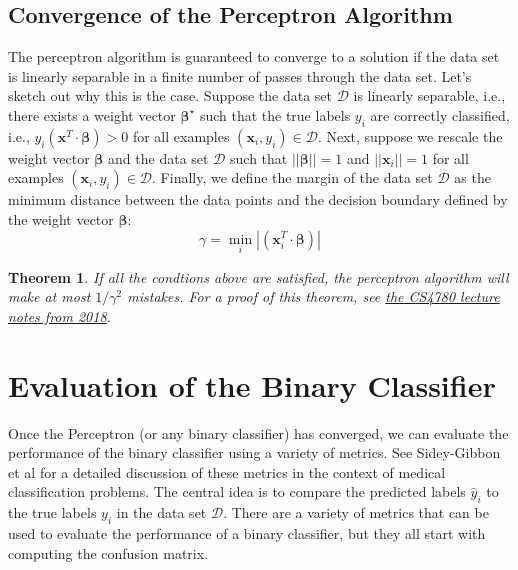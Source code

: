 \documentclass{article}[12pt]
\newtheorem{theorem}{Theorem}
\newcommand{\norm}[1]{\left|\left|#1\right|\right|}
\begin{document}
\subsection{Convergence of the Perceptron Algorithm}
The perceptron algorithm is guaranteed to converge to a solution if the data set is linearly separable in a finite number of passes through the data set.
Let's sketch out why this is the case.
Suppose the data set $\mathcal{D}$ is linearly separable, i.e., there exists a weight vector $\mathbf{\beta}^{\star}$ such that the true labels $y_{i}$ are correctly classified, i.e., 
$y_{i}\left(\mathbf{x}^{T}\cdot\mathbf{\beta}\right)>0$ for all examples $(\mathbf{x}_{i},y_{i})\in\mathcal{D}$.
Next, suppose we rescale the weight vector $\mathbf{\beta}$ and the data set $\mathcal{D}$ such that $\norm{\mathbf{\beta}}=1$ and $\norm{\mathbf{x}_{i}}=1$ for all examples $(\mathbf{x}_{i},y_{i})\in\mathcal{D}$.
Finally, we define the margin of the data set $\mathcal{D}$ as the minimum distance between the data points and the decision boundary defined by the weight vector $\mathbf{\beta}$:
\begin{equation*}
    \gamma = \min_{i}|\left(\mathbf{x}_{i}^{T}\cdot\mathbf{\beta}\right)|
\end{equation*}
\begin{theorem}\label{thm:perceptron}
If all the condtions above are satisfied, the perceptron algorithm will make at most $1/\gamma^{2}$ mistakes.
For a proof of this theorem, see \href{https://www.cs.cornell.edu/courses/cs4780/2018fa/lectures/lecturenote03.html}{the CS4780 lecture notes from 2018}.
\end{theorem}



\section{Evaluation of the Binary Classifier}
Once the Perceptron (or any binary classifier) has converged, we can evaluate the performance of the binary classifier using a variety of metrics.
See Sidey-Gibbon et al \cite{SG2019} for a detailed discussion of these metrics in the context of medical classification problems.
The central idea is to compare the predicted labels $\hat{y}_{i}$ to the true labels $y_{i}$ in the data set $\mathcal{D}$. 
There are a variety of metrics that can be used to evaluate the performance of a binary classifier, but they all start with computing the confusion matrix.
\end{document}
